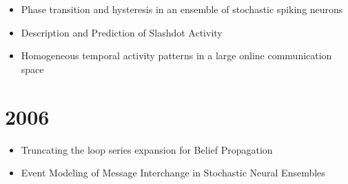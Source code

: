 \documentclass{article}
\begin{document}
\begin{itemize}
\item Phase transition and hysteresis in an ensemble of stochastic spiking neurons~\cite{kaltenbrunner2007}
\item Description and Prediction of Slashdot Activity~\cite{kaltenbrunner_LAWEB2007}
\item Homogeneous temporal activity patterns in a large online communication space~\cite{kaltenbrunner_saw2007}
\end{itemize}

\section*{2006}

\begin{itemize}
\item Truncating the loop series expansion for Belief Propagation~\cite{gomez07}
\item Event Modeling of Message Interchange in Stochastic Neural Ensembles~\cite{gomez2006}
\end{itemize}



\newpage


%
%
%
%
%
%
%
%
%
%
%
%
%
%
%

\end{document}
